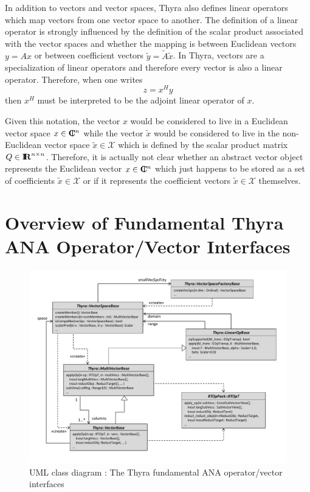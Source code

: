 \documentclass[11pt]{SANDreport}
\begin{document}
In addition to vectors and vector spaces, Thyra also defines linear
operators which map vectors from one vector space to another.  The
definition of a linear operator is strongly influenced by the
definition of the scalar product associated with the vector spaces and
whether the mapping is between Euclidean vectors $y = A x$ or between
coefficient vectors $\tilde{y} = {}\tilde{A} {}\tilde{x}$.
In Thyra, vectors are a specialization of linear operators and therefore every
vector is also a linear operator.  Therefore, when one writes
%
\begin{equation}
z = x^H y
\end{equation}
%
then $x^H$ must be interpreted to be the adjoint linear operator of $x$.

Given this notation, the vector $x$ would be considered to live in a
Euclidean vector space $x\in\mbox{\textbf{C}}\hspace{-1.1ex}\mbox{l}\hspace{0.4ex}^n$ while the vector $\tilde{x}$
would be considered to live in the non-Euclidean vector space
$\tilde{x}\in\mathcal{X}$ which is defined by the scalar product
matrix $Q\in\mbox{\textbf{I}}\hspace{-0.6ex}\mbox{\textbf{R}}^{n\times{}n}$.  Therefore, it is actually not clear
whether an abstract vector object represents the Euclidean vector
$x\in\mbox{\textbf{C}}\hspace{-1.1ex}\mbox{l}\hspace{0.4ex}^n$ which just happens to be stored as a set of coefficients
$\tilde{x}\in\mathcal{X}$ or if it represents the coefficient vectors
$\tilde{x}\in\mathcal{X}$ themselves.


%
\section{Overview of Fundamental Thyra ANA Operator/Vector Interfaces}
\label{thyra:sec:Thyra_core_overview}
%

{\bsinglespace
\begin{figure}[p]
\begin{center}
\includegraphics*[scale=0.65]{ThyraANAOpVecInterfaces}
\end{center}
\caption{
\label{thyra:fig:basic_op_vec_itfc}
UML class diagram : The Thyra fundamental ANA operator/vector interfaces }
\end{figure}
\esinglespace}
\end{document}

